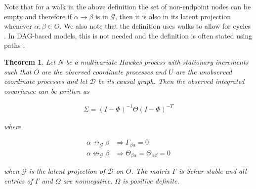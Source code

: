 \documentclass[accepted]{uai2021} %
\newtheorem{thm}{Theorem}
\begin{document}
Note that for a walk in the above definition the set of non-endpoint nodes can 
be empty and therefore if $\alpha\rightarrow\beta$ is in $\mathcal{G}$, then it 
is 
also in its latent projection whenever $\alpha,\beta\in O$. We also note that 
the definition uses walks to 
allow for cycles \citep{mogensen2018}. In DAG-based models, this is 
not needed 
and the definition is often stated using paths 
\citep{richardson2017}.

\begin{thm}

	Let $N$ be a multivariate Hawkes process with stationary increments such 
	that $O$ are the 
	observed 
	coordinate processes and $U$ are the unobserved coordinate processes and 
	let $\mathcal{D}$ be its causal graph. Then the observed integrated 
	covariance can be written as
	
	\begin{align}
	\Sigma = (I - \Phi)^{-1} \Theta (I - \Phi)^{-T}
	\label{eq:margThm}
	\end{align}
	

	
	\noindent where
	
	\begin{align*}
	\alpha \not\rightarrow_\mathcal{G} \beta & \Rightarrow 
	\Gamma_{\beta\alpha} = 0 \\
	\alpha \not\leftrightarrow_\mathcal{G} \beta & \Rightarrow 
	\Theta_{\beta\alpha} = \Theta_{\alpha\beta} = 0 
	\end{align*}
	
	when $\mathcal{G}$ is the latent projection of $\mathcal{D}$ on $O$. The 
	matrix $\Gamma$ is Schur stable and all entries of $\Gamma$ and $\Omega$ 
	are 
	nonnegative. $\Omega$ is positive definite.
\end{thm}
	
\end{document}
